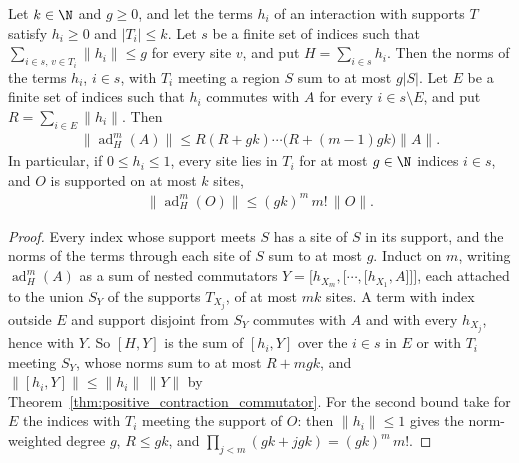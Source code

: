 \begin{theorem}
    \label{thm:bounded_degree_commutator_growth}
    \leanok
    Let $k\in\N$ and $g\ge0$, and let the terms $h_i$ of an interaction with supports
    $T$ satisfy $h_i\ge0$ and $|T_i|\le k$. Let $s$ be a finite set of indices such that
    $\sum_{i\in s,\,v\in T_i}\lVert h_i\rVert\le g$ for every site $v$, and put
    $H=\sum_{i\in s}h_i$. Then the norms of the terms $h_i$, $i\in s$, with $T_i$
    meeting a region $S$ sum to at most $g|S|$. Let $E$ be a finite set of indices such
    that $h_i$ commutes with $A$ for every $i\in s\setminus E$, and put
    $R=\sum_{i\in E}\lVert h_i\rVert$. Then
    \begin{align}
        \lVert\operatorname{ad}_H^m(A)\rVert
        \le R(R+gk)\cdots\bigl(R+(m-1)gk\bigr)\lVert A\rVert.
    \end{align}
    In particular, if $0\le h_i\le1$, every site lies in $T_i$ for at most $g\in\N$
    indices $i\in s$, and $O$ is supported on at most $k$ sites,
    \begin{align}
        \lVert\operatorname{ad}_H^m(O)\rVert\le(gk)^m\,m!\,\lVert O\rVert.
    \end{align}
\end{theorem}
\begin{proof}\leanok
    Every index whose support meets $S$ has a site of $S$ in its support, and the
    norms of the terms through each site of $S$ sum to at most $g$. Induct on $m$,
    writing $\operatorname{ad}_H^m(A)$ as a sum of nested commutators
    $Y=\lbrack h_{X_m},\lbrack\cdots,\lbrack h_{X_1},A\rbrack\rbrack\rbrack$, each attached to the union $S_Y$ of the
    supports $T_{X_j}$, of at most $mk$ sites. A term with index outside $E$ and
    support disjoint from $S_Y$ commutes with $A$ and with every $h_{X_j}$, hence with
    $Y$. So $[H,Y]$ is the sum of $[h_i,Y]$ over the $i\in s$ in $E$ or with $T_i$
    meeting $S_Y$, whose norms sum to at most $R+mgk$, and
    $\lVert[h_i,Y]\rVert\le\lVert h_i\rVert\,\lVert Y\rVert$ by
    Theorem~\ref{thm:positive_contraction_commutator}. For the second bound take for
    $E$ the indices with $T_i$ meeting the support of $O$: then $\lVert h_i\rVert\le1$
    gives the norm-weighted degree $g$, $R\le gk$, and
    $\prod_{j<m}(gk+jgk)=(gk)^m\,m!$.
\end{proof}

